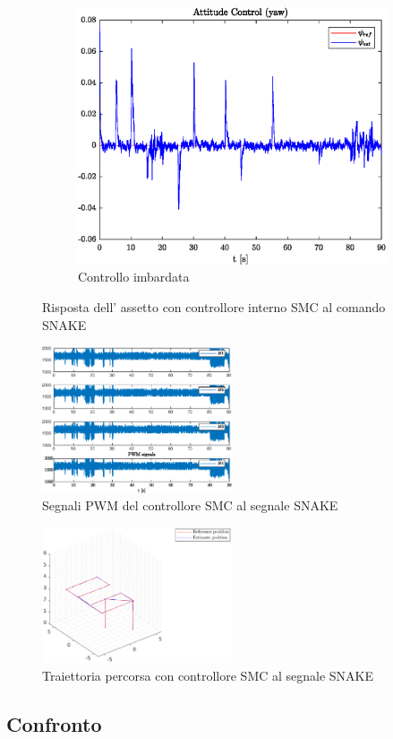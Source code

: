 \begin{figure}
\begin{subfigure}{0.45\textwidth}
	\end{subfigure}
	\hfill
	\begin{subfigure}{0.45\textwidth}
		\centering
		\includegraphics[width=1\textwidth]{Simulazioni/Figure/SMC/SNAKE/AttitudeControlYaw}
		\caption{Controllo imbardata}
	\end{subfigure}
	\caption{Risposta dell' assetto con controllore interno SMC al comando SNAKE}
\end{figure}


\begin{figure}
	\centering
	\includegraphics[width=0.5\textwidth]{Simulazioni/Figure/SMC/SNAKE/PWM}
	\caption{Segnali PWM del controllore SMC al segnale SNAKE}
\end{figure}
\begin{figure}
	\centering
	\includegraphics[width=0.5\textwidth]{Simulazioni/Figure/SMC/SNAKE/Trajectory}
	\caption{Traiettoria percorsa con controllore SMC al segnale SNAKE}
\end{figure}

\clearpage
\subsection{Confronto}